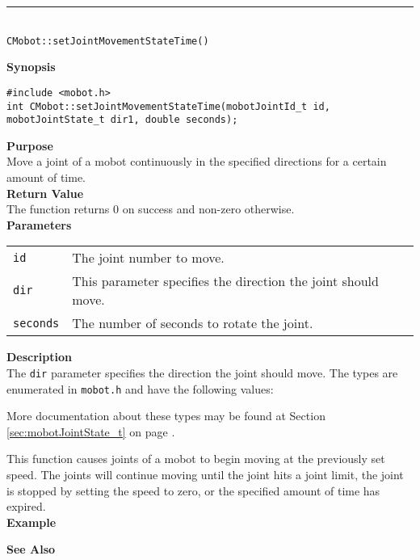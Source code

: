 \noindent
\vspace{5pt}
\rule{4.5in}{0.015in}\\
\noindent
{\LARGE \texttt{CMobot::setJointMovementStateTime()}}\\
{}

\noindent
{\bf Synopsis}
\vspace{-8pt}
\begin{verbatim}
#include <mobot.h>
int CMobot::setJointMovementStateTime(mobotJointId_t id, mobotJointState_t dir1, double seconds);
\end{verbatim}

\noindent
{\bf Purpose}\\
Move a joint of a mobot continuously in the specified directions for a certain amount of time.\\

\noindent
{\bf Return Value}\\
The function returns 0 on success and non-zero otherwise.\\

\noindent
{\bf Parameters}\\
\vspace{-0.1in}
\begin{description}
\item               
\begin{tabular}{p{10 mm}p{145 mm}}
\texttt{id} & The joint number to move. \\
\texttt{dir} & This parameter specifies the direction the joint should move. \\
\texttt{seconds} & The number of seconds to rotate the joint. \\
\end{tabular}
\end{description}

\noindent
{\bf Description}\\
The \texttt{dir} parameter specifies the direction the joint should move.
The types
are enumerated in \texttt{mobot.h} and have the following values:

More documentation about these types may be found at Section
\ref{sec:mobotJointState_t} on page
\pageref{sec:mobotJointState_t}.  

This function causes joints of a mobot to begin moving at the previously set
speed. The joints will continue moving until the joint hits a joint limit, 
the joint is stopped by setting the speed to zero, or the specified amount of
time has expired. \\

\noindent
{\bf Example}\\
\noindent

\noindent
{\bf See Also}\\

